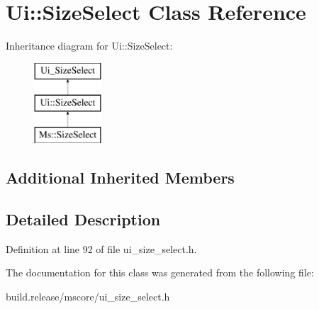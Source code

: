 \hypertarget{class_ui_1_1_size_select}{}\section{Ui\+:\+:Size\+Select Class Reference}
\label{class_ui_1_1_size_select}
Inheritance diagram for Ui\+:\+:Size\+Select\+:\begin{figure}[H]
\begin{center}
\leavevmode
\includegraphics[height=3.000000cm]{class_ui_1_1_size_select}
\end{center}
\end{figure}
\subsection*{Additional Inherited Members}


\subsection{Detailed Description}


Definition at line 92 of file ui\+\_\+size\+\_\+select.\+h.



The documentation for this class was generated from the following file\+:\begin{DoxyCompactItemize}
\item 
build.\+release/mscore/ui\+\_\+size\+\_\+select.\+h\end{DoxyCompactItemize}
